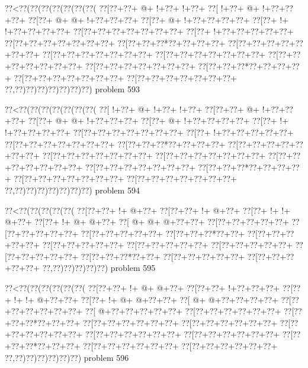 \vbox{\vbox{\goo
\0??<\0??(\0??(\0??(\0??(\0??(\0??(\0??(
\0??[\0??+\0??+\- @+\- !+\0??+\- !+\0??+
\0??[\- !+\0??+\- @+\- !+\0??+\0??+\0??+
\0??[\0??+\- @+\- @+\- !+\0??+\0??+\0??+
\0??[\0??+\- @+\- !+\0??+\0??+\0??+\0??+
\0??[\0??+\- !+\- !+\0??+\0??+\0??+\0??+
\0??[\0??+\0??+\0??+\0??+\0??+\0??+\0??+
\0??[\0??+\- !+\0??+\0??+\0??+\0??+\0??+
\0??[\0??+\0??+\0??+\0??+\0??+\0??+\0??+
\0??[\0??+\0??+\0??*\0??+\0??+\0??+\0??+
\0??[\0??+\0??+\0??+\0??+\0??+\0??+\0??+
\0??[\0??+\0??+\0??+\0??+\0??+\0??+\0??+
\0??[\0??+\0??+\0??+\0??+\0??+\0??+\0??+
\0??[\0??+\0??+\0??+\0??+\0??+\0??+\0??+
\0??[\0??+\0??+\0??+\0??+\0??+\0??+\0??+
\0??[\0??+\0??+\0??*\0??+\0??+\0??+\0??+
\0??[\0??+\0??+\0??+\0??+\0??+\0??+\0??+
\0??[\0??+\0??+\0??+\0??+\0??+\0??+\0??+
\0??,\0??)\0??)\0??)\0??)\0??)\0??)\0??)
}
\hfil problem 593\hfil\break
}

\vbox{\vbox{\goo
\0??<\0??(\0??(\0??(\0??(\0??(\0??(\0??(
\0??[\- !+\0??+\- @+\- !+\0??+\- !+\0??+
\0??[\0??+\0??+\- @+\- !+\0??+\0??+\0??+
\0??[\0??+\- @+\- @+\- !+\0??+\0??+\0??+
\0??[\0??+\- @+\- !+\0??+\0??+\0??+\0??+
\0??[\0??+\- !+\- !+\0??+\0??+\0??+\0??+
\0??[\0??+\0??+\0??+\0??+\0??+\0??+\0??+
\0??[\0??+\- !+\0??+\0??+\0??+\0??+\0??+
\0??[\0??+\0??+\0??+\0??+\0??+\0??+\0??+
\0??[\0??+\0??+\0??*\0??+\0??+\0??+\0??+
\0??[\0??+\0??+\0??+\0??+\0??+\0??+\0??+
\0??[\0??+\0??+\0??+\0??+\0??+\0??+\0??+
\0??[\0??+\0??+\0??+\0??+\0??+\0??+\0??+
\0??[\0??+\0??+\0??+\0??+\0??+\0??+\0??+
\0??[\0??+\0??+\0??+\0??+\0??+\0??+\0??+
\0??[\0??+\0??+\0??*\0??+\0??+\0??+\0??+
\0??[\0??+\0??+\0??+\0??+\0??+\0??+\0??+
\0??[\0??+\0??+\0??+\0??+\0??+\0??+\0??+
\0??,\0??)\0??)\0??)\0??)\0??)\0??)\0??)
}
\hfil problem 594\hfil\break
}

\vbox{\vbox{\goo
\0??<\0??(\0??(\0??(\0??(\0??(
\0??[\0??+\0??+\- !+\- @+\0??+
\0??[\0??+\0??+\- !+\- @+\0??+
\0??[\0??+\- !+\- !+\- @+\0??+
\0??[\0??+\- !+\- @+\- @+\0??+
\0??[\- @+\- @+\- @+\0??+\0??+
\0??[\0??+\0??+\0??+\0??+\0??+
\0??[\0??+\0??+\0??+\0??+\0??+
\0??[\0??+\0??+\0??+\0??+\0??+
\0??[\0??+\0??+\0??*\0??+\0??+
\0??[\0??+\0??+\0??+\0??+\0??+
\0??[\0??+\0??+\0??+\0??+\0??+
\0??[\0??+\0??+\0??+\0??+\0??+
\0??[\0??+\0??+\0??+\0??+\0??+
\0??[\0??+\0??+\0??+\0??+\0??+
\0??[\0??+\0??+\0??*\0??+\0??+
\0??[\0??+\0??+\0??+\0??+\0??+
\0??[\0??+\0??+\0??+\0??+\0??+
\0??,\0??)\0??)\0??)\0??)\0??)
}
\hfil problem 595\hfil\break
}

\vbox{\vbox{\goo
\0??<\0??(\0??(\0??(\0??(\0??(\0??(
\0??[\0??+\0??+\- !+\- @+\- @+\0??+
\0??[\0??+\0??+\- !+\0??+\0??+\0??+
\0??[\0??+\- !+\- !+\- @+\0??+\0??+
\0??[\0??+\- !+\- @+\- @+\0??+\0??+
\0??[\- @+\- @+\0??+\0??+\0??+\0??+
\0??[\0??+\0??+\0??+\0??+\0??+\0??+
\0??[\- @+\0??+\0??+\0??+\0??+\0??+
\0??[\0??+\0??+\0??+\0??+\0??+\0??+
\0??[\0??+\0??+\0??*\0??+\0??+\0??+
\0??[\0??+\0??+\0??+\0??+\0??+\0??+
\0??[\0??+\0??+\0??+\0??+\0??+\0??+
\0??[\0??+\0??+\0??+\0??+\0??+\0??+
\0??[\0??+\0??+\0??+\0??+\0??+\0??+
\0??[\0??+\0??+\0??+\0??+\0??+\0??+
\0??[\0??+\0??+\0??*\0??+\0??+\0??+
\0??[\0??+\0??+\0??+\0??+\0??+\0??+
\0??[\0??+\0??+\0??+\0??+\0??+\0??+
\0??,\0??)\0??)\0??)\0??)\0??)\0??)
}
\hfil problem 596\hfil\break
}

